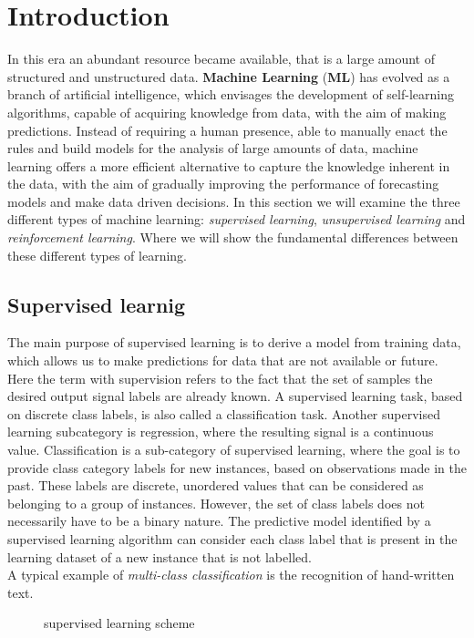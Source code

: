 \section{Introduction}
\label{sec:intro}
In this era an abundant resource became available, that is a large amount of
structured and unstructured data.
\textbf{Machine Learning} (\textbf{ML}) has evolved as a branch of artificial
intelligence, which envisages the development of self-learning algorithms,
capable of acquiring knowledge from data, with the aim of making predictions.
Instead of requiring a human presence, able to manually enact the rules and
build models for the analysis of large amounts of data, machine learning offers
a more efficient alternative to capture the knowledge inherent in the data,
with the aim of gradually improving the performance of forecasting models and
make data driven decisions.
In this section we will examine the three different types of machine learning:
\emph{supervised learning}, \emph{unsupervised learning} and
\emph{reinforcement learning}.
Where we will show the fundamental differences between these different types of
learning.\cite{raschka2016machine}
%
\subsection{Supervised learnig}
\label{subsec:supervised-learnig}
The main purpose of supervised learning is to derive a model from 
training data, which allows us to make predictions for data that are not
available or future.
Here the term with supervision refers to the fact that the
set of samples the desired output signal labels are already known.
A supervised learning task, based on discrete class labels, is also called a
classification task.
Another supervised learning subcategory is regression, where the resulting
signal is a continuous value.
Classification is a sub-category of supervised learning, where the goal is to
provide class category labels for new instances, based on observations made in
the past.
These labels are discrete, unordered values ​​that can be considered as
belonging to a group of instances.
However, the set of class labels does not necessarily have to be a binary
nature.
The predictive model identified by a supervised learning algorithm can consider
each class label that is present in the learning dataset of a new instance that
is not labelled.\\
A typical example of \emph{multi-class classification} is the recognition of
hand-written text.\cite{raschka2016machine}
%
\begin{figure}[!h]
\centering
{} 
\caption{supervised learning scheme} 
\label{fig:supervised-learning-scheme}
\end{figure}
%

